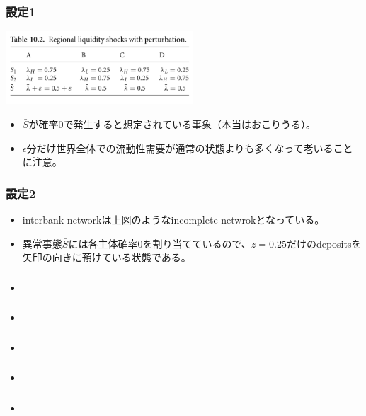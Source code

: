 \documentclass[dvipdfmx, 12pt]{beamer}
\begin{document}
\begin{frame}\frametitle{設定1}
	\includegraphics[width = 7cm]{10-2.png}
	
	\begin{itemize}
	\item $\bar{S}$が確率0で発生すると想定されている事象（本当はおこりうる）。
	\item $\epsilon$分だけ世界全体での流動性需要が通常の状態よりも多くなって老いることに注意。
	\end{itemize}
\end{frame}

\begin{frame}\frametitle{設定2}
	\begin{itemize}
	\item interbank networkは上図のようなincomplete netwrokとなっている。
	\item 異常事態$\bar{S}$には各主体確率0を割り当てているので、$z = 0.25$だけのdepositsを矢印の向きに預けている状態である。
	\end{itemize}
\end{frame}

\begin{frame}\frametitle{}
	\begin{itemize}
	\item 
	\end{itemize}
\end{frame}

\begin{frame}\frametitle{}
	\begin{itemize}
	\item 
	\end{itemize}
\end{frame}

\begin{frame}\frametitle{}
	\begin{itemize}
	\item 
	\end{itemize}
\end{frame}

\begin{frame}\frametitle{}
	\begin{itemize}
	\item 
	\end{itemize}
\end{frame}

\begin{frame}\frametitle{}
	\begin{itemize}
	\item 
	\end{itemize}
\end{frame}
\end{document}
